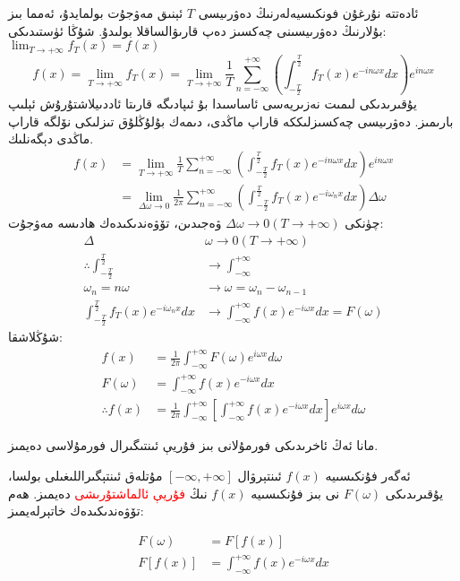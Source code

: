  ئادەتتە نۇرغۇن فونكىسيەلەرنىڭ دەۋرىيسى $T$ ئېنىق مەۋجۇت بولمايدۇ، ئەمما بىز بۇلارنىڭ دەۋرىيسىنى چەكسىز دەپ قارىۋالساقلا بولىدۇ.  شۇڭا ئۈستىدىكى: $\lim_{T \to + \infty}f_T(x) = f(x)$ 
 $$
 f(x) = \lim_{T \to + \infty}f_T(x) = \lim_{T \to +\infty} \frac{1}{T}\sum_{n=-\infty}^{+\infty} \left (\int_{-\frac{T}{2}}^{\frac{T}{2}} f_T(x)e^{-in \omega x}dx \right)e^{in \omega x}
 $$
 يۇقىرىدىكى لىمىت نەزىريەسى ئاساسىدا بۇ ئىپادىگە قارىتا ئاددىيلاشتۇرۇش ئېلىپ بارىمىز. دەۋرىيسى چەكسىزلىككە قاراپ ماڭدى، دىمەك بۇلۇڭلۇق تىزلىكى نۆلگە قاراپ ماڭدى دېگەنلىك.
\begin{align*}
 f(x) &= \lim_{T \to +\infty} \frac{1}{T}\sum_{n=-\infty}^{+\infty} \left (\int_{-\frac{T}{2}}^{\frac{T}{2}} f_T(x)e^{-in \omega x}dx \right)e^{in \omega x} \\
 &= \lim_{\Delta \omega \to 0}\frac{1}{2 \pi} \sum_{n=-\infty}^{+\infty} 
 \left (\int_{-\frac{T}{2}}^{\frac{T}{2}} f_T(x)e^{-i\omega_n x}dx \right) \Delta \omega
\end{align*}
چۈنكى $\Delta \omega \to 0(T \to +\infty)$ ۋەجىدىن، تۆۋەندىكىدەك ھادىسە مەۋجۇت:
\begin{align*}
\Delta &\omega \to 0(T \to +\infty) \\
\therefore \int_{-\frac{T}{2}}^{\frac{T}{2}} &\rightarrow \int_{-\infty}^{+\infty} \\
{\omega_n=n\omega} &\rightarrow {\omega=\omega_n-\omega_{n-1}} \\
\int_{-\frac{T}{2}}^{\frac{T}{2}} f_T(x)e^{-i\omega_n x}dx &\rightarrow
\int_{-\infty}^{+\infty} f(x)e^{-i\omega x}dx = F(\omega)
\end{align*}
شۇڭلاشقا:
\begin{align*}
f(x) &= \frac{1}{2 \pi} \int_{-\infty}^{+\infty}F(\omega)e^{i \omega x}d\omega \\
F(\omega) &= \int_{-\infty}^{+\infty} f(x)e^{-i\omega x}dx \\
\therefore f(x) &= \frac{1}{2 \pi} \int_{-\infty}^{+\infty}\left [ \int_{-\infty}^{+\infty} f(x)e^{-i\omega x}dx \right]
e^{i \omega x}d\omega
\end{align*}

مانا ئەڭ ئاخرىدىكى فورمۇلانى بىز فۇريې ئىنتىگىرال فورمۇلاسى دەيمىز.

ئەگەر فۇنكىسىيە $f(x)$ ئىنتېرۋال $[-\infty,+\infty]$ مۇتلەق ئىنتېگىراللىغىلى بولسا، يۇقىرىدىكى $F(\omega)$ نى بىز فۇنكىسىيە $f(x)$ نىڭ 
\textcolor{red}{فۇريې ئالماشتۇرىشى}
دەيمىز. ھەم تۆۋەندىكىدەك خاتېرلەيمىز:

\begin{align*}
F(\omega) &= F[f(x)] \\
F[f(x)] &= \int_{-\infty}^{+\infty} f(x)e^{-i\omega x}dx
\end{align*}

